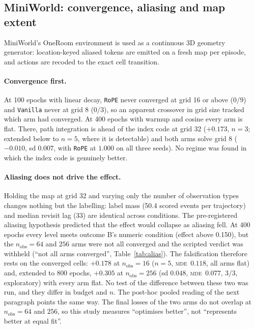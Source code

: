 \documentclass[10pt]{article}
\newcommand{\mde}{\textsc{mde}}
\newcommand{\arm}[1]{\texttt{#1}}
\begin{document}
\subsection{MiniWorld: convergence, aliasing and map extent}
\label{sec:c2-miniworld}

MiniWorld's OneRoom environment is used as a continuous 3D geometry generator: location-keyed aliased
tokens are emitted on a fresh map per episode, and actions are recoded to the exact cell transition.

\paragraph{Convergence first.} At 100 epochs with linear decay, \arm{RoPE} never converged at grid 16
or above ($0/9$) and \arm{Vanilla} never at grid 8 ($0/3$), so an apparent crossover in grid size
tracked which arm had converged. At 400 epochs with warmup and cosine every arm is flat. There,
path integration is ahead of the index code at grid 32 ($+0.173$, $n=3$; extended below to $n=5$, where it is detectable) and both
arms solve grid 8 ($-0.010$, sd $0.007$, with \arm{RoPE} at $1.000$ on all three seeds). No regime was
found in which the index code is genuinely better. %

\paragraph{Aliasing does not drive the effect.} Holding the map at grid 32 and varying only the number
of observation types changes nothing but the labelling: label mass (50.4 scored events per trajectory)
and median revisit lag (33) are identical across conditions. The pre-registered aliasing hypothesis
predicted that the effect would collapse as aliasing fell. At 400 epochs every level meets outcome B's
numeric condition (effect above 0.150), but the $n_{\mathrm{obs}}=64$ and $256$ arms were not all converged
and the scripted verdict was withheld (``not all arms converged'', Table~\ref{tab:alias}). The falsification
therefore rests on the converged cells: $+0.178$ at $n_{\mathrm{obs}}=16$ ($n=5$, \mde\ $0.118$, all arms
flat) and, extended to 800 epochs, $+0.305$ at $n_{\mathrm{obs}}=256$ (sd $0.048$, \mde\ $0.077$, $3/3$,
exploratory) with every arm flat. No test of the difference between these two was run, and they differ in
budget and $n$. The post-hoc pooled reading of the next paragraph points the same way. The final losses of the two arms do not overlap at
$n_{\mathrm{obs}}=64$ and $256$, so this study measures ``optimises better'', not ``represents better at
equal fit''. %
\end{document}

